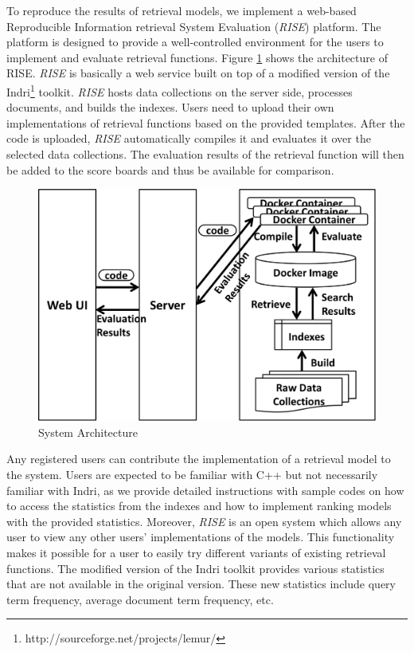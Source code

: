 To reproduce the results of retrieval models, we implement 
a web-based Reproducible Information retrieval System Evaluation ({\em RISE}) 
platform.  The platform is designed to provide a well-controlled 
environment for the users to implement and evaluate retrieval functions.  
Figure \ref{fig:system} shows the architecture of RISE. 
{\em RISE} is basically a web service built on top of a modified 
version of the Indri\footnote{http://sourceforge.net/projects/lemur/} toolkit. 
{\em RISE} hosts data collections on the server side, processes documents, 
and builds the indexes.
Users need to upload their own implementations 
of retrieval functions based on the provided templates.  
After the code is uploaded,  {\em RISE} automatically compiles it and 
evaluates it over the selected data collections. 
The evaluation results of the retrieval function will 
then be added to the score boards and thus be available for comparison.   

\begin{figure}[t]
\centering
    \includegraphics[width=1.0\textwidth]{figures/RISE.eps}
    \caption{System Architecture\label{fig:system}}
\end{figure}

Any registered users can contribute the implementation of 
a retrieval model to the system. Users are 
expected to be familiar with C++ but not necessarily 
familiar with Indri, as we provide detailed instructions with sample codes on how to 
access the statistics from the indexes and how to implement ranking models with 
the provided statistics.  Moreover, {\em RISE} is an open system which 
allows any user to view any other users' implementations of the models.  
This functionality makes it possible for a user to easily try 
different variants of existing retrieval functions. 
The modified version of the Indri toolkit provides various 
statistics that are not available in the original version. 
These new statistics include query term frequency, average document term 
frequency, etc. 

